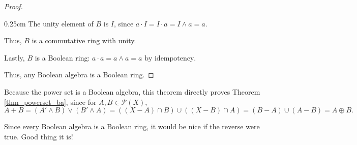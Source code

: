 \documentclass[10pt, letterpaper]{article}
\newcommand{\powerset}[1]{\mathcal{P}(#1)}
\newenvironment{tabOver}[1]
{\begin{adjustwidth}{#1cm}{}}{\end{adjustwidth}}
\theoremstyle{definition}
\begin{document}
\begin{proof}
\begin{tabOver}{0.25}
		The unity element of \(B\) is \(I\), since
		\(a\cdot I=I\cdot a = I\wedge a = a\).

		Thus, \(B\) is a commutative ring with unity.
	\end{tabOver}

	Lastly, \(B\) is a Boolean ring:
	\(a\cdot a = a\wedge a = a\text{ by idempotency.}\)
	
	Thus, any Boolean algebra is a Boolean ring.
\end{proof}

Because the power set is a Boolean algebra, 
this theorem directly proves Theorem \ref{thm_powerset_ba}, since for \(A,B\in\powerset{X}\),
\[A+B=(A'\wedge B)\vee(B'\wedge A)=((X-A)\cap B)\cup ((X-B)\cap A)=(B-A)\cup(A-B)=A\oplus B.\]

Since every Boolean algebra is a Boolean ring, it would be nice if the reverse were true.
Good thing it is!
\end{document}
